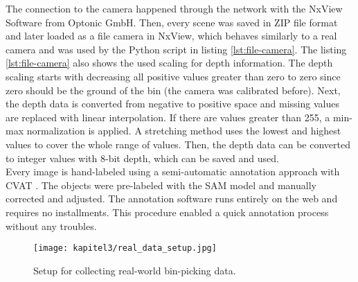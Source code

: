 		The connection to the camera happened through the network with the NxView Software from Optonic GmbH. Then, every scene was saved in ZIP file format and later loaded as a file camera in NxView, which behaves similarly to a real camera and was used by the Python script in listing \ref{lst:file-camera}. The listing \ref{lst:file-camera} also shows the used scaling for depth information. The depth scaling starts with decreasing all positive values greater than zero to zero since zero should be the ground of the bin (the camera was calibrated before). Next, the depth data is converted from negative to positive space and missing values are replaced with linear interpolation. If there are values greater than 255, a min-max normalization is applied. A stretching method uses the lowest and highest values to cover the whole range of values. Then, the depth data can be converted to integer values with 8-bit depth, which can be saved and used.\\
		Every image is hand-labeled using a semi-automatic annotation approach with CVAT \cite{cvat}. The objects were pre-labeled with the SAM model \cite{Kirillov2023} and manually corrected and adjusted. The annotation software runs entirely on the web and requires no installments. This procedure enabled a quick annotation process without any troubles.
		\begin{figure}[h]
			\centering
			\texttt{[image: kapitel3/real\_data\_setup.jpg]}
			\caption[Setup for collecting real-world bin-picking data.]{Setup for collecting real-world bin-picking data.}
			\label{img:real-data-setup}
		\end{figure}




